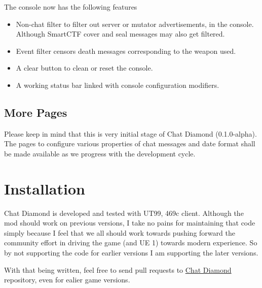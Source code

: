 \documentclass{article}
\theoremstyle{definition}
\newcommand{\ChatDiamondVersion}{0.1.0-alpha}
\begin{document}
The console now has the following features
\begin{itemize}
\item Non-chat filter to filter out server or mutator advertisements, in the console. Although SmartCTF cover and seal messages may also get filtered.
\item Event filter censors death messages corresponding to the weapon used.
\item A clear button to clean or reset the console.
\item A working status bar linked with console configuration modifiers.
\end{itemize}

\subsection{More Pages}
Please keep in mind that this is very initial stage of Chat Diamond (\ChatDiamondVersion).  The pages to configure various properties of chat messages
and date format shall be made available as we progress with the development cycle.

\section{Installation}
Chat Diamond is developed and tested with UT99, 469c client.  Although the mod should work on previous versions, I take no pains for maintaining that code simply because I feel that we all should work towards pushing forward the community effort in driving the game (and UE 1) towards modern experience.  So by not supporting the code for earlier versions I am supporting the later versions.

With that being written, feel free to send pull requests to \href{https://github.com/ravimohan1991/ChatDiamond/}{Chat Diamond} repository, even for ealier game versions.
\end{document}
